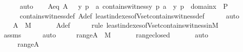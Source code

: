 \begin{isabellebody}
\ \ \ \ \isamarkupfalse%
\ auto\isanewline
\isanewline
\ \ \isamarkupfalse%
\ Aeq{\isacharcolon}{\kern0pt}\ {\isachardoublequoteopen}A\ {\isacharequal}{\kern0pt}\ {\isacharbraceleft}{\kern0pt}\ {\isacharless}{\kern0pt}{\isacharless}{\kern0pt}y{\isacharcomma}{\kern0pt}\ p{\isachargreater}{\kern0pt}{\isacharcomma}{\kern0pt}\ {\isacharparenleft}{\kern0pt}{\isasymmu}\ a{\isachardot}{\kern0pt}\ contains{\isacharunderscore}{\kern0pt}witness{\isacharparenleft}{\kern0pt}y{\isacharcomma}{\kern0pt}\ p{\isacharcomma}{\kern0pt}\ a{\isacharparenright}{\kern0pt}{\isacharparenright}{\kern0pt}{\isachargreater}{\kern0pt}\ {\isachardot}{\kern0pt}\ {\isacharless}{\kern0pt}y{\isacharcomma}{\kern0pt}\ p{\isachargreater}{\kern0pt}\ {\isasymin}\ domain{\isacharparenleft}{\kern0pt}x{\isacharparenright}{\kern0pt}\ {\isasymtimes}\ P\ {\isacharbraceright}{\kern0pt}{\isachardoublequoteclose}\ \isanewline
\ \ \ \ \isamarkupfalse%
\ contains{\isacharunderscore}{\kern0pt}witness{\isacharunderscore}{\kern0pt}def\ A{\isacharunderscore}{\kern0pt}def\ least{\isacharunderscore}{\kern0pt}indexes{\isacharunderscore}{\kern0pt}of{\isacharunderscore}{\kern0pt}Vset{\isacharunderscore}{\kern0pt}contains{\isacharunderscore}{\kern0pt}witness{\isacharunderscore}{\kern0pt}def\isanewline
\ \ \ \ \isamarkupfalse%
\ auto\isanewline
\isanewline
\ \ \isamarkupfalse%
\ {\isachardoublequoteopen}A\ {\isasymin}\ M{\isachardoublequoteclose}\ \isanewline
\ \ \ \ \isamarkupfalse%
\ A{\isacharunderscore}{\kern0pt}def\ \isanewline
\ \ \ \ \isamarkupfalse%
{\isacharparenleft}{\kern0pt}rule\ least{\isacharunderscore}{\kern0pt}indexes{\isacharunderscore}{\kern0pt}of{\isacharunderscore}{\kern0pt}Vset{\isacharunderscore}{\kern0pt}contains{\isacharunderscore}{\kern0pt}witness{\isacharunderscore}{\kern0pt}in{\isacharunderscore}{\kern0pt}M{\isacharparenright}{\kern0pt}\isanewline
\ \ \ \ \isamarkupfalse%
\ assms\isanewline
\ \ \ \ \isamarkupfalse%
\ auto\isanewline
\isanewline
\ \ \isamarkupfalse%
\ \isamarkupfalse%
\ {\isachardoublequoteopen}range{\isacharparenleft}{\kern0pt}A{\isacharparenright}{\kern0pt}\ {\isasymin}\ M{\isachardoublequoteclose}\ \isanewline
\ \ \ \ \isamarkupfalse%
\ range{\isacharunderscore}{\kern0pt}closed\ \isanewline
\ \ \ \ \isamarkupfalse%
\ auto\isanewline
\isanewline
\ \ \isamarkupfalse%
\ {\isasymalpha}\ \ {\isachardoublequoteopen}{\isasymalpha}\ {\isasymequiv}\ {\isasymUnion}range{\isacharparenleft}{\kern0pt}A{\isacharparenright}{\kern0pt}{\isachardoublequoteclose}\ \isanewline

\end{isabellebody}
